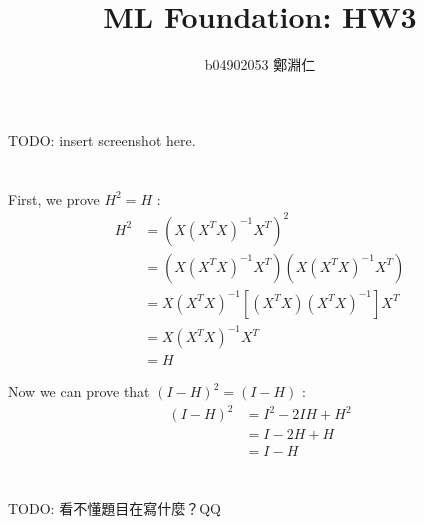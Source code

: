 \documentclass[12pt,a4paper]{article}
\title{ML Foundation: HW3}
\author{b04902053 鄭淵仁}
\begin{document}
\maketitle
\section{}

TODO: insert screenshot here.

\section{}

First, we prove ${H}^{2} = H$ :
\[
	\begin{aligned}
		{H}^{2} &= {(X {({X}^{T}X)}^{-1} {X}^{T})} ^ {2} \\
				&= (X {({X}^{T}X)}^{-1} {X}^{T}) (X {({X}^{T}X)}^{-1} {X}^{T}) \\
				&= X {({X}^{T}X)}^{-1} [ ({X}^{T} X) {({X}^{T}X)}^{-1} ] {X}^{T} \\
				&= X {({X}^{T}X)}^{-1} {X}^{T} \\
				&= H
	\end{aligned}
\]

Now we can prove that ${(I-H)}^{2} = (I-H)$ :
\[
	\begin{aligned}
		{(I-H)}^{2} &= {I}^{2} - 2IH + {H}^{2} \\
					&= I - 2H + H \\
					&= I - H
	\end{aligned}
\]

\section{}

TODO: 看不懂題目在寫什麼？QQ

\section{}
\end{document}
